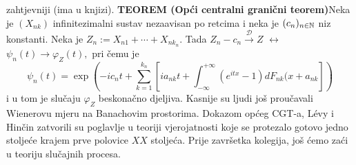 \documentclass{article}
\begin{document}
zahtjevniji (ima u knjizi).\newline\newline
\textbf{TEOREM (Opći centralni granični teorem)}\newline Neka je \((X_{nk})\) infinitezimalni sustav nezaavisan po retcima i neka je \((c_n)_{n\in\Bbb N}\) niz konstanti. Neka je \(Z_n:=X_{n1}+\cdots+X_{nk_n}.\) Tada  \(Z_n-c_n\overset{\mathcal D}{\longrightarrow}Z\) \(\leftrightarrow\) \(\psi_n(t)\to\varphi_Z(t),\) pri čemu je \[\psi_n(t)=\exp\left(-ic_nt+\sum_{k=1}^{k_n}\left[ia_{nk}t+\int_{-\infty}^{+\infty}\left(e^{itx}-1\right)dF_{nk}(x+a_{nk}\right]\right)\] i u tom je slučaju \(\varphi_Z\) beskonačno djeljiva.\newline\newline
Kasnije su ljudi još proučavali Wienerovu mjeru na Banachovim prostorima. Dokazom općeg CGT-a, L\'evy i Hinčin zatvorili su poglavlje u teoriji vjerojatnosti koje se protezalo gotovo jedno stoljeće krajem prve polovice \(XX\) stoljeća. Prije završetka kolegija, još ćemo zaći u teoriju slučajnih procesa. 
\newpage
\end{document}
